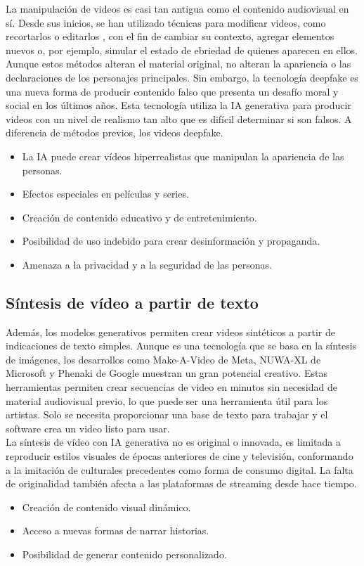 \documentclass[12pt]{article}
\begin{document}
La manipulación de videos es casi tan antigua como el contenido audiovisual en sí. Desde sus inicios, se han utilizado técnicas para modificar videos, como recortarlos o editarlos , con el fin de cambiar su contexto, agregar elementos nuevos o, por ejemplo, simular el estado de ebriedad de quienes aparecen en ellos. Aunque estos métodos alteran el material original, no alteran la apariencia o las declaraciones de los personajes principales. Sin embargo, la tecnología deepfake es una nueva forma de producir contenido falso que presenta un desafío moral y social en los últimos años. Esta tecnología utiliza la IA generativa para producir videos con un nivel de realismo tan alto que es difícil determinar si son falsos. A diferencia de métodos previos, los videos deepfake.
\begin{itemize}
    \item La IA puede crear vídeos hiperrealistas que manipulan la apariencia de las personas.
    \item Efectos especiales en películas y series.
    \item Creación de contenido educativo y de entretenimiento.
    \item Posibilidad de uso indebido para crear desinformación y propaganda.
    \item Amenaza a la privacidad y a la seguridad de las personas.
\end{itemize}

\subsection{Síntesis de vídeo a partir de texto}\label{sec:figs}

Además, los modelos generativos permiten crear videos sintéticos a partir de indicaciones de texto simples.
Aunque es una tecnología que se basa en la síntesis de imágenes, los desarrollos como Make-A-Video de Meta, NUWA-XL de Microsoft y Phenaki de Google muestran un gran potencial creativo.
Estas herramientas permiten crear secuencias de video en minutos sin necesidad de material audiovisual previo, lo que puede ser una herramienta útil para los artistas. Solo se necesita proporcionar una base de texto para trabajar y el software crea un video listo para usar.\\
La síntesis de vídeo con IA generativa no es original o innovada, es limitada a reproducir estilos visuales de épocas anteriores de cine y televisión, conformando a la imitación de culturales precedentes como forma de consumo digital. La falta de originalidad también afecta a las plataformas de streaming desde hace tiempo.
\begin{itemize}
    \item Creación de contenido visual dinámico.
    \item Acceso a nuevas formas de narrar historias.
    \item Posibilidad de generar contenido personalizado.
\end{itemize}
\end{document}
